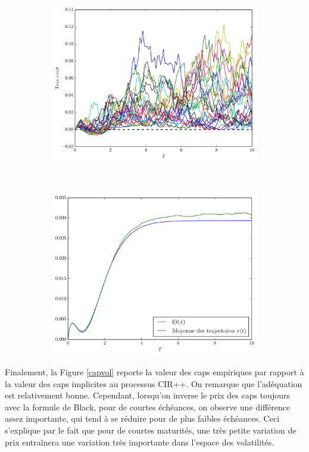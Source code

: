 \begin{figure}
  \centering
  \begin{subfigure}{0.3\paperwidth}
    \centering
    \includegraphics[width=0.3\paperwidth]{../fig/processes.pdf}
  \end{subfigure}
  ~
  \begin{subfigure}{0.3\paperwidth}
    \centering
    \includegraphics[width=0.3\paperwidth]{../fig/mean_p.pdf}
  \end{subfigure}
  \caption{}
  \label{processes}
\end{figure}

Finalement, la Figure \ref{capvol} reporte la valeur des caps empiriques par rapport à la
valeur des caps implicites au processus CIR++. On remarque que l'adéquation est
relativement bonne. Cependant, lorsqu'on inverse le prix des caps toujours avec la formule
de Black, pour de courtes échéances, on observe une différence assez importante, qui tend
à se réduire pour de plus faibles échéances. Ceci s'explique par le fait que pour de
courtes maturités, une très petite variation de prix entraînera une variation très
importante dans l'espace des volatilités.


